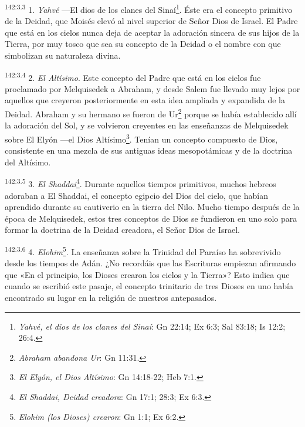 \par
\textsuperscript{142:3.3} 1. \textit{Yahvé} ---El dios de los clanes del Sinaí\footnote{\textit{Yahvé, el dios de los clanes del Sinaí}: Gn 22:14; Ex 6:3; Sal 83:18; Is 12:2; 26:4.}. Éste era el concepto primitivo de la Deidad, que Moisés elevó al nivel superior de Señor Dios de Israel. El Padre que está en los cielos nunca deja de aceptar la adoración sincera de sus hijos de la Tierra, por muy tosco que sea su concepto de la Deidad o el nombre con que simbolizan su naturaleza divina.

\par
\textsuperscript{142:3.4} 2. \textit{El Altísimo}. Este concepto del Padre que está en los cielos fue proclamado por Melquisedek a Abraham, y desde Salem fue llevado muy lejos por aquellos que creyeron posteriormente en esta idea ampliada y expandida de la Deidad. Abraham y su hermano se fueron de Ur\footnote{\textit{Abraham abandona Ur}: Gn 11:31.} porque se había establecido allí la adoración del Sol, y se volvieron creyentes en las enseñanzas de Melquisedek sobre El Elyón ---el Dios Altísimo\footnote{\textit{El Elyón, el Dios Altísimo}: Gn 14:18-22; Heb 7:1.}. Tenían un concepto compuesto de Dios, consistente en una mezcla de sus antiguas ideas mesopotámicas y de la doctrina del Altísimo.

\par
\textsuperscript{142:3.5} 3. \textit{El Shaddai}\footnote{\textit{El Shaddai, Deidad creadora}: Gn 17:1; 28:3; Ex 6:3.}. Durante aquellos tiempos primitivos, muchos hebreos adoraban a El Shaddai, el concepto egipcio del Dios del cielo, que habían aprendido durante su cautiverio en la tierra del Nilo. Mucho tiempo después de la época de Melquisedek, estos tres conceptos de Dios se fundieron en uno solo para formar la doctrina de la Deidad creadora, el Señor Dios de Israel.

\par
\textsuperscript{142:3.6} 4. \textit{Elohim}\footnote{\textit{Elohim (los Dioses) crearon}: Gn 1:1; Ex 6:2.}. La enseñanza sobre la Trinidad del Paraíso ha sobrevivido desde los tiempos de Adán. ¿No recordáis que las Escrituras empiezan afirmando que «En el principio, los Dioses crearon los cielos y la Tierra»? Esto indica que cuando se escribió este pasaje, el concepto trinitario de tres Dioses en uno había encontrado su lugar en la religión de nuestros antepasados.

